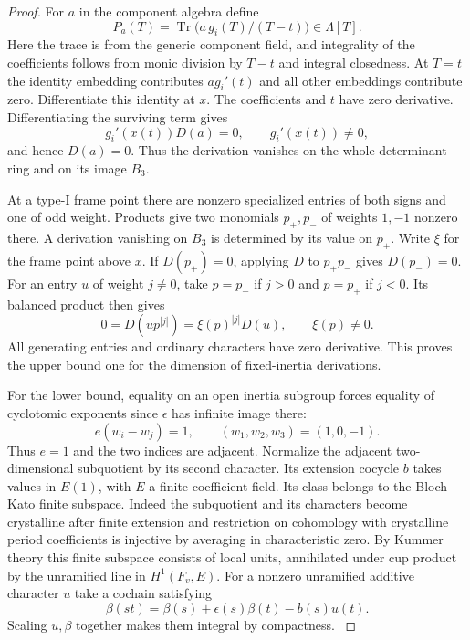 \begin{proof}
For \(a\) in the component algebra define
\[
          P_a(T)=\operatorname{Tr}\bigl(a\,g_i(T)/(T-t)\bigr)
                     \in\Lambda[T].
\]
Here the trace is from the generic component field, and
integrality of the coefficients follows from monic division
by \(T-t\) and integral closedness. At \(T=t\) the identity
embedding contributes \(a g_i'(t)\) and all other embeddings
contribute zero. Differentiate this identity at \(x\). The coefficients and \(t\) have zero derivative. Differentiating the surviving term gives 
\[
 g_i'(x(t))D(a)=0,\qquad g_i'(x(t))\ne0,
\]
 and hence \(D(a)=0\). Thus the derivation
vanishes on the whole determinant ring and on its image \(B_3\).

At a type-I frame point there are nonzero specialized entries
of both signs and one of odd weight. Products give two
monomials \(p_+,p_-\) of weights \(1,-1\) nonzero there.
A derivation vanishing on \(B_3\) is determined by its value
on \(p_+\). Write \(\xi\) for the frame point above \(x\). If \(D(p_+)=0\), applying \(D\) to \(p_+p_-\) gives \(D(p_-)=0\). For an entry \(u\) of weight \(j\ne0\), take \(p=p_-\) if \(j>0\) and \(p=p_+\) if \(j<0\). Its balanced product then gives 
\[
 0=D(up^{|j|})=\xi(p)^{|j|}D(u),\qquad \xi(p)\ne0.
\]
 All generating entries
and ordinary characters have zero derivative. This proves the
upper bound one for the dimension of fixed-inertia derivations.

For the lower bound, equality on an open inertia subgroup forces equality of cyclotomic exponents since \(\epsilon\) has infinite image there:
\[
 e(w_i-w_j)=1,\qquad (w_1,w_2,w_3)=(1,0,-1).
\] Thus \(e=1\) and
the two indices are adjacent. Normalize the adjacent
two-dimensional subquotient by its second character. Its
extension cocycle \(b\) takes values in \(E(1)\), with \(E\)
a finite coefficient field. Its class belongs to the
Bloch--Kato finite subspace. Indeed the subquotient and its
characters become crystalline after finite extension and
restriction on cohomology with crystalline period coefficients
is injective by averaging in characteristic zero. By Kummer
theory this finite subspace consists of local units, annihilated
under cup product by the unramified line in \(H^1(F_v,E)\).
For a nonzero unramified additive character \(u\) take a
cochain satisfying
\[
      \beta(st)=\beta(s)+\epsilon(s)\beta(t)-b(s)u(t).
\]
Scaling \(u,\beta\) together makes them integral by compactness.
\cite{bloch-kato-finite}


\end{proof}
